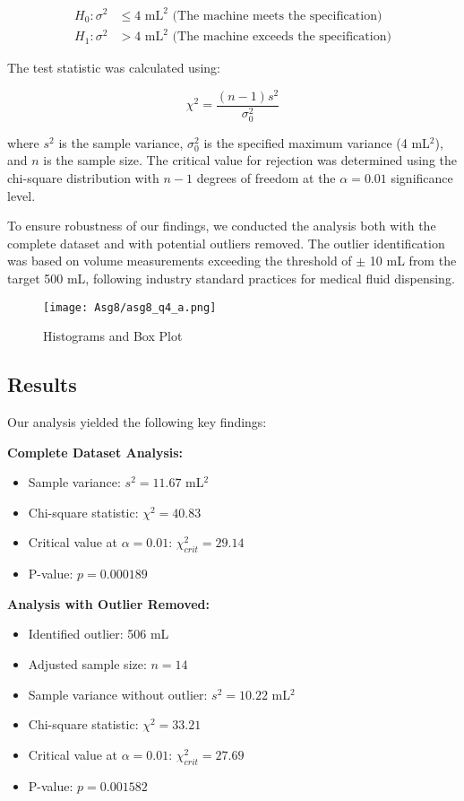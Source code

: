 \documentclass[12pt]{article}
\begin{document}
\begin{align}
H_0: \sigma^2 &\leq 4 \text{ mL}^2 \text{ (The machine meets the specification)} \\
H_1: \sigma^2 &> 4 \text{ mL}^2 \text{ (The machine exceeds the specification)}
\end{align}

The test statistic was calculated using:

\begin{equation}
\chi^2 = \frac{(n-1)s^2}{\sigma_0^2}
\end{equation}

\noindent where $s^2$ is the sample variance, $\sigma_0^2$ is the specified maximum variance (4 mL$^2$), and $n$ is the sample size. The critical value for rejection was determined using the chi-square distribution with $n-1$ degrees of freedom at the $\alpha = 0.01$ significance level.

To ensure robustness of our findings, we conducted the analysis both with the complete dataset and with potential outliers removed. The outlier identification was based on volume measurements exceeding the threshold of $\pm$ 10 mL from the target 500 mL, following industry standard practices for medical fluid dispensing.
\begin{figure}[H]
    \centering
    \texttt{[image: Asg8/asg8\_q4\_a.png]}
    \caption{Histograms and Box Plot}
    \label{fig:enter-label}
\end{figure}
\subsection{Results}
Our analysis yielded the following key findings:

\textbf{Complete Dataset Analysis:}
\begin{itemize}
    \item Sample variance: $s^2 = 11.67$ mL$^2$
    \item Chi-square statistic: $\chi^2 = 40.83$
    \item Critical value at $\alpha = 0.01$: $\chi^2_{crit} = 29.14$
    \item P-value: $p = 0.000189$
\end{itemize}

\textbf{Analysis with Outlier Removed:}
\begin{itemize}
    \item Identified outlier: 506 mL
    \item Adjusted sample size: $n = 14$
    \item Sample variance without outlier: $s^2 = 10.22$ mL$^2$
    \item Chi-square statistic: $\chi^2 = 33.21$
    \item Critical value at $\alpha = 0.01$: $\chi^2_{crit} = 27.69$
    \item P-value: $p = 0.001582$
\end{itemize}
\end{document}
